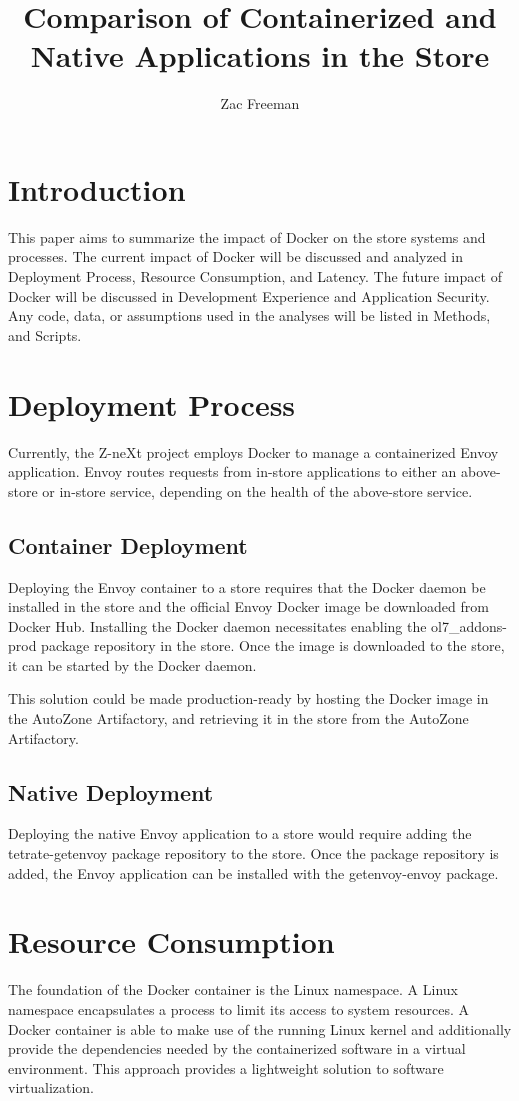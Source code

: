 \documentclass{article}
\title{Comparison of Containerized and Native Applications in the Store}
\author{Zac Freeman}
\begin{document}
\maketitle

\section{Introduction}
This paper aims to summarize the impact of Docker on the store systems and processes. The current impact of Docker will be discussed and analyzed in Deployment Process, Resource Consumption, and Latency. The future impact of Docker will be discussed in Development Experience and Application Security. Any code, data, or assumptions used in the analyses will be listed in Methods, and Scripts.

\section{Deployment Process}
Currently, the Z-neXt project employs Docker to manage a containerized Envoy application. Envoy routes requests from in-store applications to either an above-store or in-store service, depending on the health of the above-store service.

\subsection{Container Deployment}
Deploying the Envoy container to a store requires that the Docker daemon be installed in the store and the official Envoy Docker image be downloaded from Docker Hub. Installing the Docker daemon necessitates enabling the ol7\_addons-prod package repository in the store. Once the image is downloaded to the store, it can be started by the Docker daemon.

This solution could be made production-ready by hosting the Docker image in the AutoZone Artifactory, and retrieving it in the store from the AutoZone Artifactory.

\subsection{Native Deployment}
Deploying the native Envoy application to a store would require adding the tetrate-getenvoy package repository to the store. Once the package repository is added, the Envoy application can be installed with the getenvoy-envoy package.

\section{Resource Consumption}
The foundation of the Docker container is the Linux namespace. A Linux namespace encapsulates a process to limit its access to system resources. A Docker container is able to make use of the running Linux kernel and additionally provide the dependencies needed by the containerized software in a virtual environment. This approach provides a lightweight solution to software virtualization.
\end{document}
